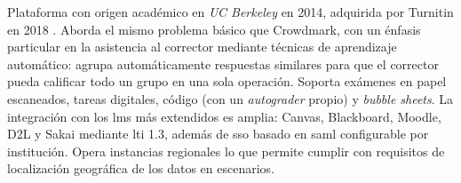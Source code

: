 Plataforma con origen académico en \textit{UC Berkeley} en 2014, adquirida
por Turnitin en 2018 \cite{singh2017gradescope}. Aborda el mismo problema
básico que Crowdmark, con un énfasis particular en la asistencia al
corrector mediante técnicas de aprendizaje automático: agrupa
automáticamente respuestas similares para que el corrector pueda calificar
todo un grupo en una sola operación. Soporta exámenes en papel escaneados,
tareas digitales, código (con un \textit{autograder} propio) y
\textit{bubble sheets}. La integración con los \acs{lms} más extendidos es
amplia: Canvas, Blackboard, Moodle, D2L y Sakai mediante \acs{lti} 1.3,
además de \acs{sso} basado en \acs{saml} configurable por institución.
Opera instancias regionales lo que permite cumplir con requisitos de
localización geográfica de los datos en escenarios.
